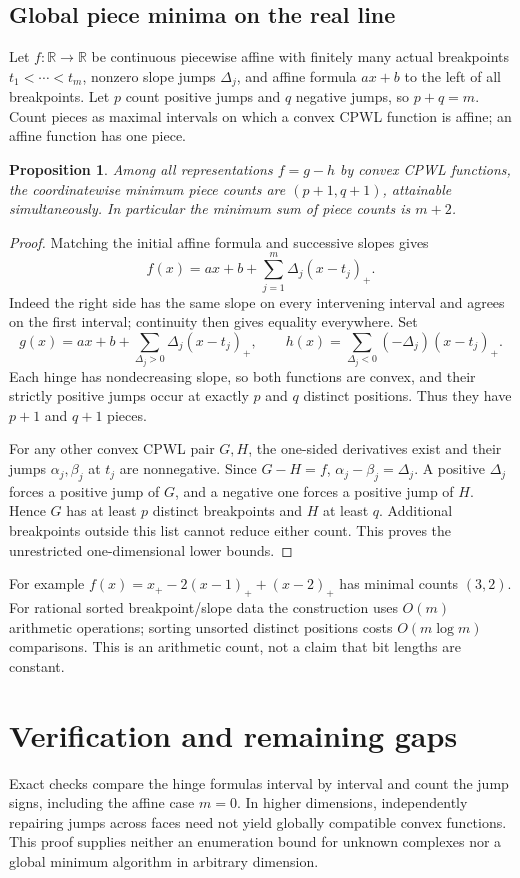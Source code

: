 \documentclass[11pt]{article}
\newtheorem{proposition}{Proposition}
\begin{document}
\subsection{Global piece minima on the real line}
Let $f:\mathbb R\to\mathbb R$ be continuous piecewise affine with finitely many actual breakpoints $t_1<\cdots<t_m$, nonzero slope jumps $\Delta_j$, and affine formula $ax+b$ to the left of all breakpoints. Let $p$ count positive jumps and $q$ negative jumps, so $p+q=m$. Count pieces as maximal intervals on which a convex CPWL function is affine; an affine function has one piece.
\begin{proposition}
Among all representations $f=g-h$ by convex CPWL functions, the coordinatewise minimum piece counts are $(p+1,q+1)$, attainable simultaneously. In particular the minimum sum of piece counts is $m+2$.
\end{proposition}
\begin{proof}
Matching the initial affine formula and successive slopes gives
\[
 f(x)=ax+b+\sum_{j=1}^m\Delta_j(x-t_j)_+.
\]
Indeed the right side has the same slope on every intervening interval and agrees on the first interval; continuity then gives equality everywhere. Set
\[
 g(x)=ax+b+\sum_{\Delta_j>0}\Delta_j(x-t_j)_+,
 \qquad h(x)=\sum_{\Delta_j<0}(-\Delta_j)(x-t_j)_+.
\]
Each hinge has nondecreasing slope, so both functions are convex, and their strictly positive jumps occur at exactly $p$ and $q$ distinct positions. Thus they have $p+1$ and $q+1$ pieces.

For any other convex CPWL pair $G,H$, the one-sided derivatives exist and their jumps $\alpha_j,\beta_j$ at $t_j$ are nonnegative. Since $G-H=f$, $\alpha_j-\beta_j=\Delta_j$. A positive $\Delta_j$ forces a positive jump of $G$, and a negative one forces a positive jump of $H$. Hence $G$ has at least $p$ distinct breakpoints and $H$ at least $q$. Additional breakpoints outside this list cannot reduce either count. This proves the unrestricted one-dimensional lower bounds.
\end{proof}
For example $f(x)=x_+-2(x-1)_++(x-2)_+$ has minimal counts $(3,2)$. For rational sorted breakpoint/slope data the construction uses $O(m)$ arithmetic operations; sorting unsorted distinct positions costs $O(m\log m)$ comparisons. This is an arithmetic count, not a claim that bit lengths are constant.
\section{Verification and remaining gaps}
Exact checks compare the hinge formulas interval by interval and count the jump signs, including the affine case $m=0$. In higher dimensions, independently repairing jumps across faces need not yield globally compatible convex functions. This proof supplies neither an enumeration bound for unknown complexes nor a global minimum algorithm in arbitrary dimension.
\end{document}
